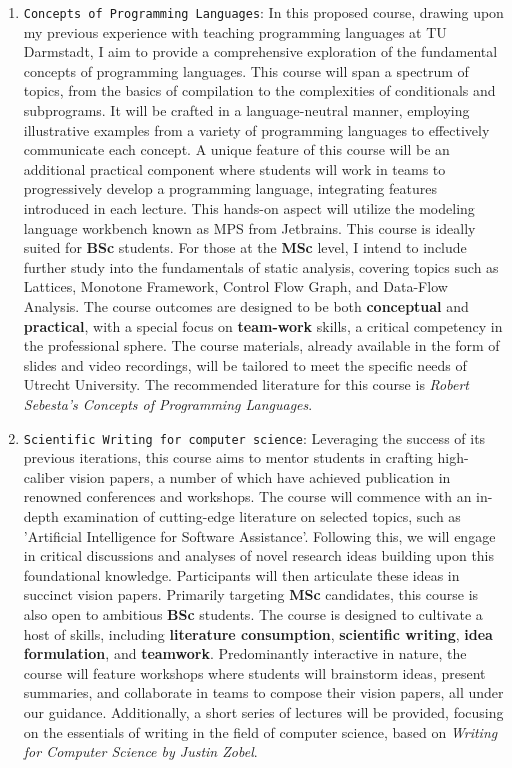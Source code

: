 \documentclass[12pt,a4paper,sans]{moderncv}
\begin{document}
\begin{enumerate}
    \item \texttt{Concepts of Programming Languages}: In this proposed course, drawing upon my previous experience with teaching programming languages at TU Darmstadt, I aim to provide a comprehensive exploration of the fundamental concepts of programming languages. This course will span a spectrum of topics, from the basics of compilation to the complexities of conditionals and subprograms. It will be crafted in a language-neutral manner, employing illustrative examples from a variety of programming languages to effectively communicate each concept. A unique feature of this course will be an additional practical component where students will work in teams to progressively develop a programming language, integrating features introduced in each lecture. This hands-on aspect will utilize the modeling language workbench known as MPS from Jetbrains. This course is ideally suited for \textbf{BSc} students. For those at the \textbf{MSc} level, I intend to include further study into the fundamentals of static analysis, covering topics such as Lattices, Monotone Framework, Control Flow Graph, and Data-Flow Analysis. The course outcomes are designed to be both \textbf{conceptual} and \textbf{practical}, with a special focus on \textbf{team-work} skills, a critical competency in the professional sphere. The course materials, already available in the form of slides and video recordings, will be tailored to meet the specific needs of Utrecht University. The recommended literature for this course is \textit{Robert Sebesta's Concepts of Programming Languages}.
    \item \texttt{Scientific Writing for computer science}:  Leveraging the success of its previous iterations, this course aims to mentor students in crafting high-caliber vision papers, a number of which have achieved publication in renowned conferences and workshops. The course will commence with an in-depth examination of cutting-edge literature on selected topics, such as 'Artificial Intelligence for Software Assistance'. Following this, we will engage in critical discussions and analyses of novel research ideas building upon this foundational knowledge. Participants will then articulate these ideas in succinct vision papers. Primarily targeting \textbf{MSc} candidates, this course is also open to ambitious \textbf{BSc} students. The course is designed to cultivate a host of skills, including \textbf{literature consumption}, \textbf{scientific writing}, \textbf{idea formulation}, and \textbf{teamwork}. Predominantly interactive in nature, the course will feature workshops where students will brainstorm ideas, present summaries, and collaborate in teams to compose their vision papers, all under our guidance. Additionally, a short series of lectures will be provided, focusing on the essentials of writing in the field of computer science, based on \textit{Writing for Computer Science by Justin Zobel}.

\end{enumerate}
\end{document}
